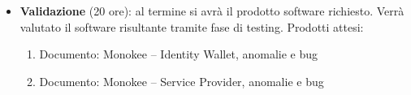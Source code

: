 \begin{itemize}
\item \textbf{Validazione} (20 ore): al termine si avrà il prodotto software richiesto. Verrà valutato il software risultante tramite fase di testing.
    Prodotti attesi: 
    \begin{enumerate}
        \item Documento: Monokee – Identity Wallet, anomalie e bug
        \item Documento: Monokee – Service Provider, anomalie e bug 
    \end{enumerate}
    
\end{itemize}